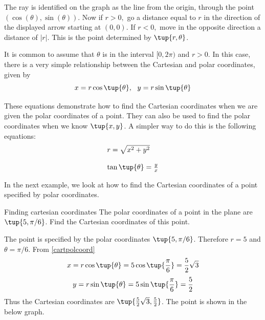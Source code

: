 The ray is identified on the graph as the line from the origin, through the point $(\cos(\theta),\sin(\theta))$. Now if $r>0,$ go a distance
equal to $r$ in the direction of the displayed arrow starting at $(0,0)$. If 
$r<0,$ move in the opposite direction a distance of $\left\vert r\right\vert 
$. This is the point determined by $\tup{r,\theta }$.

It is common to assume that $\theta $ is in the interval $
[0,2\pi )$ and $r>0.$ In this case, there is a very simple relationship
between the Cartesian and polar coordinates, given by
\begin{equation}
x=r\cos \tup{\theta } ,\ \ y=r\sin \tup{\theta } 
\label{cartpolcoord}
\end{equation}

These equations demonstrate how to find the Cartesian coordinates when we are given the polar coordinates of a point. They can also be used to find the polar coordinates when we know $\tup{x, y }$. A simpler way to do this is the following equations:
\begin{equation}
\begin{array}{l}
r = \sqrt{x^2 + y^2} \\
\\
\tan \tup{\theta} = \frac{y}{x}
\end{array}
\label{polcartcoord}
\end{equation}

In the next example, we look at how to find the Cartesian coordinates of a point specified by polar coordinates. 

\begin{example}{Finding cartesian coordinates}{}
The polar coordinates of a point in the plane are $\tup{5,\pi /6} $.
Find the Cartesian coordinates of this point.
\end{example}

\begin{solution}
The point is specified by the polar coordinates $\tup{5,\pi /6}$. Therefore $r=5$ and $\theta = \pi /6$. 
From \ref{cartpolcoord}
\[
x= r \cos \tup{\theta }= 5\cos \tup{\vspace{0.05in}\frac{\pi }{6}} = \vspace{0.05in}\frac{5}{2}\sqrt{3}
\]
\[
y= r \sin \tup{\theta } = 5\sin \tup{\vspace{0.05in}\frac{\pi }{6}} = \vspace{0.05in}\frac{5}{2}
\]
Thus the Cartesian coordinates are $\tup{\vspace{0.05in}\frac{5}{2}\sqrt{3}, \vspace{0.05in}\frac{5}{2}}$. The point is shown in the below graph. 

\begin{center}
\end{center}
\end{solution}

